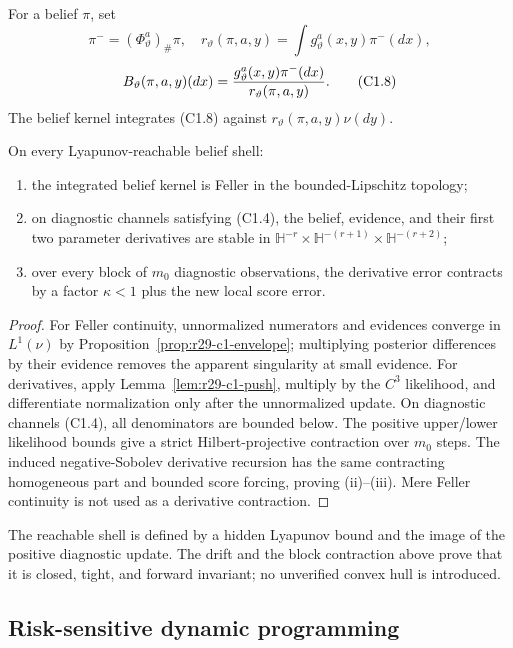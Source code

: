 For a belief $\pi$, set
\[
 \pi^-=(\Phi^a_\vartheta)_\#\pi,
 \quad r_\vartheta(\pi,a,y)=\int g_\vartheta^a(x,y)\pi^-(dx),            \tag{C1.7}
\]
\[
 B_\vartheta(\pi,a,y)(dx)
 ={g_\vartheta^a(x,y)\pi^-(dx)\over r_\vartheta(\pi,a,y)}.              \tag{C1.8}
\]
The belief kernel integrates (C1.8) against
$r_\vartheta(\pi,a,y)\nu(dy)$.

\begin{theorem}
\label{thm:r29-c1-filter}
On every Lyapunov-reachable belief shell:

\begin{enumerate}[label=(\roman*)]
\item the integrated belief kernel is Feller in the bounded-Lipschitz
      topology;
\item on diagnostic channels satisfying (C1.4), the belief, evidence, and
      their first two parameter derivatives are stable in
      $\mathbb H^{-r}\times\mathbb H^{-(r+1)}\times\mathbb H^{-(r+2)}$;
\item over every block of $m_0$ diagnostic observations, the derivative error
      contracts by a factor $\kappa<1$ plus the new local score error.
\end{enumerate}
\end{theorem}

\begin{proof}
For Feller continuity, unnormalized numerators and evidences converge in
$L^1(\nu)$ by Proposition~\ref{prop:r29-c1-envelope}; multiplying posterior
differences by their evidence removes the apparent singularity at small
evidence.  For derivatives, apply Lemma~\ref{lem:r29-c1-push}, multiply by the
$C^3$ likelihood, and differentiate normalization only after the unnormalized
update.  On diagnostic channels (C1.4), all denominators are bounded below.
The positive upper/lower likelihood bounds give a strict Hilbert-projective
contraction over $m_0$ steps.  The induced negative-Sobolev derivative
recursion has the same contracting homogeneous part and bounded score forcing,
proving (ii)--(iii).  Mere Feller continuity is not used as a derivative
contraction.
\end{proof}

The reachable shell is defined by a hidden Lyapunov bound and the image of the
positive diagnostic update.  The drift and the block contraction above prove
that it is closed, tight, and forward invariant; no unverified convex hull is
introduced.

\subsection{Risk-sensitive dynamic programming}

